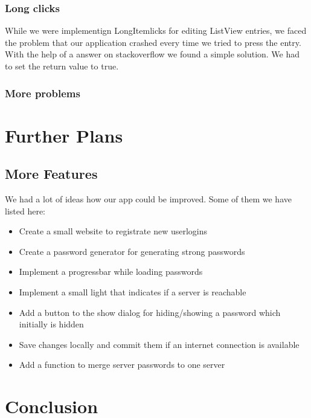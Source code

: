 \documentclass{report}
\begin{document}
\subsubsection{Long clicks}
While we were implementign LongItemlicks for editing ListView entries, we faced the problem that our application crashed every time we tried to press the entry. With the help of a answer on stackoverflow \cite{stackoverflow} we found a simple solution. We had to set the return value to true.
\subsubsection{More problems}

\section{Further Plans}
\subsection{More Features}
We had a lot of ideas how our app could be improved. Some of them we have listed here:
\begin{itemize}
         \item Create a small website to registrate new userlogins
         \item Create a password generator for generating strong passwords
         \item Implement a progressbar while loading passwords
         \item Implement a small light that indicates if a server is reachable
         \item Add a button to the show dialog for hiding/showing a password which initially is hidden
         \item Save changes locally and commit them if an internet connection is available
         \item Add a function to merge server passwords to one server
      \end{itemize}
 
\subsection{}

\section{Conclusion}




\end{document}
